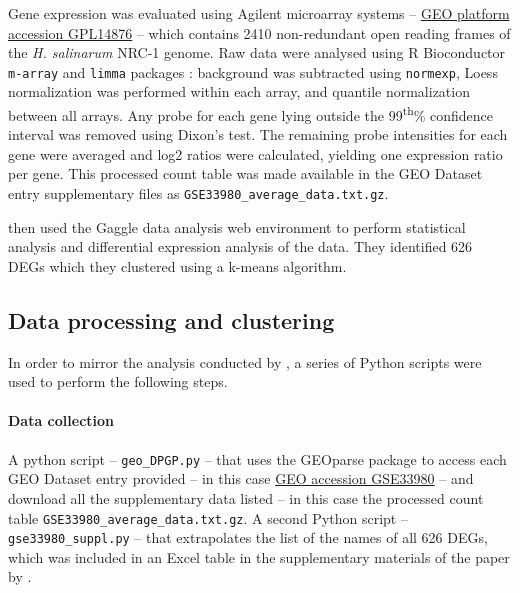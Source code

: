 Gene expression was evaluated using Agilent microarray systems -- \href{https://www.ncbi.nlm.nih.gov/geo/query/acc.cgi?acc=GPL14876}{GEO platform accession GPL14876} -- which contains 2410 non-redundant open reading frames of the \textit{H. salinarum} NRC-1 genome. Raw data were analysed using R Bioconductor \texttt{m-array} \citep{paquetMarrayExploratoryAnalysis2023} and \texttt{limma} packages \citep{ritchieLimmaPowersDifferential2015,smythLimmaLinearModels2023}: background was subtracted using \texttt{normexp}, Loess normalization was performed within each array, and quantile normalization between all arrays. Any probe for each gene lying outside the 99\textsuperscript{th}\% confidence interval was removed using Dixon's test. The remaining probe intensities for each gene were averaged and log2 ratios were calculated, yielding one expression ratio per gene. This processed count table was made available in the GEO Dataset entry supplementary files as \texttt{GSE33980\_average\_data.txt.gz}.

\citeauthor{sharmaRosRTranscriptionFactor2012} then used the Gaggle data analysis web environment \citep{shannonGaggleOpensourceSoftware2006} to perform statistical analysis and differential expression analysis of the data. They identified 626 DEGs which they clustered using a k-means algorithm.

\subsection{Data processing and clustering}\label{preprocess}
In order to mirror the analysis conducted by \citeauthor{mcdowellClusteringGeneExpression2018}, a series of Python scripts were used to perform the following steps.
\paragraph{Data collection} A python script -- \texttt{geo\_DPGP.py} -- that uses the GEOparse package \citep{gumiennyGEOparsePythonLibrary2021} to access each GEO Dataset entry provided -- in this case \href{https://www.ncbi.nlm.nih.gov/geo/query/acc.cgi?acc=GSE33980}{GEO accession GSE33980} -- and download all the supplementary data listed -- in this case the processed count table \texttt{GSE33980\_average\_data.txt.gz}. A second Python script -- \texttt{gse33980\_suppl.py} -- that extrapolates the list of the names of all 626 DEGs, which was included in an Excel table in the supplementary materials of the paper by \citeauthor{sharmaRosRTranscriptionFactor2012}.
